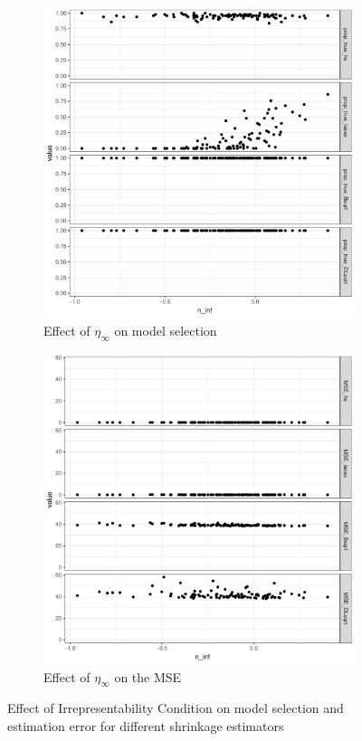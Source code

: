 \documentclass[ba]{imsart}
\begin{document}
\begin{figure}[ht!]%
\centering
\begin{subfigure}[t]{0.45\textwidth}
\centering
\includegraphics[width=\columnwidth]{Irrep_model_selec_n100p60_q50_2groups}%
\caption{Effect of $\eta_{\infty}$ on model selection}%
\label{fig:profile:MSP_irrep}%
\end{subfigure}
\begin{subfigure}[t]{0.45\textwidth}
\centering
\includegraphics[width=\columnwidth]{Irrep_MSE_selec_n100p60_q50_2groups}%
\caption{Effect of  $\eta_{\infty}$ on the MSE}%
\label{fig:profile:MSE_irrep}%
\end{subfigure}
\caption{Effect of Irrepresentability Condition on model selection and estimation error for different shrinkage estimators}
\label{fig:profile}
\end{figure}
\end{document}
